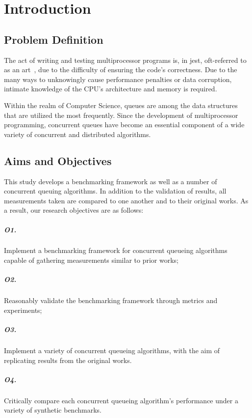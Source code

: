 \chapter{Introduction}
\section{Problem Definition}

The act of writing and testing multiprocessor programs is, in jest,
oft-referred to as an art~\citep{herlihy2020art}, due to the difficulty of
ensuring the code's correctness. 
Due to the many ways to unknowingly cause
performance penalties or data corruption, intimate knowledge of the CPU's
architecture and memory is required. 

Within the realm of Computer Science, queues are among the data structures that
are utilized the most frequently. Since the development of multiprocessor
programming, concurrent queues have become an essential component of a wide
variety of concurrent and distributed algorithms.

\section{Aims and Objectives}

This study develops a benchmarking framework as well as a number of concurrent
queuing algorithms. In addition to the validation of results, all measurements
taken are compared to one another and to their original works. As a result, our
research objectives are as follows:

\paragraph{O1.} Implement a benchmarking framework for concurrent queueing
algorithms capable of gathering measurements similar to prior works;
\paragraph{O2.} Reasonably validate the benchmarking framework through
metrics and experiments;
\paragraph{O3.} Implement a variety of concurrent queueing algorithms, with the aim
of replicating results from the original works.
\paragraph{O4.} Critically compare each concurrent queueing algorithm's performance
under a variety of synthetic benchmarks.

